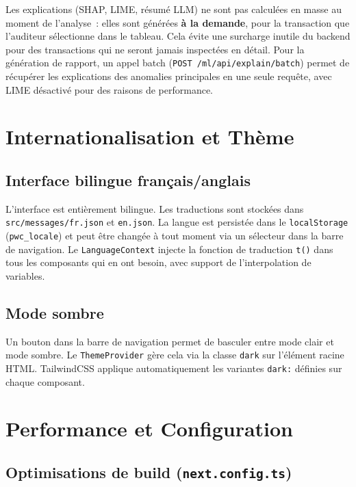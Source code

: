 Les explications (SHAP, LIME, résumé LLM) ne sont pas calculées en masse au moment de l'analyse~: elles sont générées \textbf{à la demande}, pour la transaction que l'auditeur sélectionne dans le tableau. Cela évite une surcharge inutile du backend pour des transactions qui ne seront jamais inspectées en détail. Pour la génération de rapport, un appel batch (\texttt{POST /ml/api/explain/batch}) permet de récupérer les explications des anomalies principales en une seule requête, avec LIME désactivé pour des raisons de performance.

\section{Internationalisation et Thème}

\subsection{Interface bilingue français/anglais}

L'interface est entièrement bilingue. Les traductions sont stockées dans \texttt{src/messages/fr.json} et \texttt{en.json}. La langue est persistée dans le \texttt{localStorage} (\texttt{pwc\_locale}) et peut être changée à tout moment via un sélecteur dans la barre de navigation. Le \texttt{LanguageContext} injecte la fonction de traduction \texttt{t()} dans tous les composants qui en ont besoin, avec support de l'interpolation de variables.

\subsection{Mode sombre}

Un bouton dans la barre de navigation permet de basculer entre mode clair et mode sombre. Le \texttt{ThemeProvider} gère cela via la classe \texttt{dark} sur l'élément racine HTML. TailwindCSS applique automatiquement les variantes \texttt{dark:} définies sur chaque composant.

\section{Performance et Configuration}

\subsection{Optimisations de build (\texttt{next.config.ts})}

